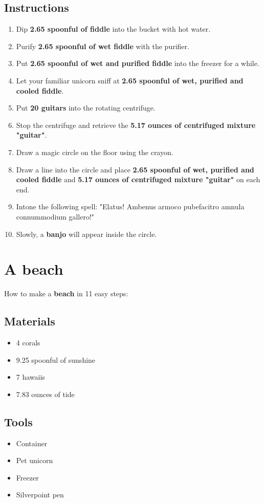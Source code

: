 \documentclass{article}
\begin{document}
\subsection{Instructions}\begin{enumerate}
\item 
Dip \textbf{2.65 spoonful of fiddle} into the bucket with hot water.
\item 
Purify \textbf{2.65 spoonful of wet fiddle} with the purifier.
\item 
Put \textbf{2.65 spoonful of wet and purified fiddle} into the freezer for a while.
\item 
Let your familiar unicorn sniff at \textbf{2.65 spoonful of wet, purified and cooled fiddle}.
\item 
Put \textbf{20 guitars} into the rotating centrifuge.
\item 
Stop the centrifuge and retrieve the \textbf{5.17 ounces of centrifuged mixture "guitar"}.
\item 
Draw a magic circle on the floor using the crayon.
\item 
Draw a line into the circle and place \textbf{2.65 spoonful of wet, purified and cooled fiddle} and \textbf{5.17 ounces of centrifuged mixture "guitar"} on each end.
\item 
Intone the following spell: "Elatus! Ambenus armoco pubefacitro amnula connummodium gallero!"
\item 
Slowly, a \textbf{banjo} will appear inside the circle.
\end{enumerate}
\newpage
\section{A beach}How to make a \textbf{beach} in 11 easy steps:

\subsection{Materials}\begin{itemize}
\item 
4 corals
\item 
9.25 spoonful of sunshine
\item 
7 hawaiis
\item 
7.83 ounces of tide
\end{itemize}
\subsection{Tools}\begin{itemize}
\item 
Container
\item 
Pet unicorn
\item 
Freezer
\item 
Silverpoint pen
\end{itemize}
\end{document}
